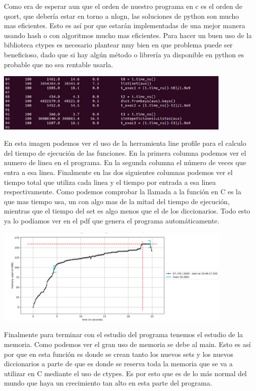 \documentclass{article}
\begin{document}
Como era de esperar aun que el orden de nuestro programa en c es el orden de qsort, que debería estar en torno a nlogn, las soluciones de python son mucho mas eficientes. Esto es así por que estarán implementadas de una mejor manera usando hash o con algoritmos mucho mas eficientes. Para hacer un buen uso de la biblioteca ctypes es necesario plantear muy bien en que problema puede ser beneficioso, dado que si hay algún método o librería ya disponible en python es probable que no sea rentable usarla.

\includegraphics[width=11.5cm]{Line_profile.PNG}

En esta imagen podemos ver el uso de la herramienta line profile para el calculo del tiempo de ejecución de las funciones. En la primera columna podemos ver el numero de linea en el programa. En la segunda columna el número de veces que entra a esa linea. Finalmente en las dos siguientes columnas podemos ver el tiempo total que utiliza cada linea y el tiempo por entrada a esa linea respectivamente. Como podemos comprobar la llamada a la función en C es la que mas tiempo usa, un con algo mas de la mitad del tiempo de ejecución, mientras que el tiempo del set es algo menos que el de los diccionarios. Todo esto ya lo podíamos ver en el pdf que genera el programa automáticamente.

\includegraphics[width=11.5cm]{memory_profile.PNG}

Finalmente para terminar con el estudio del programa tenemos el estudio de la memoria. Como podemos ver el gran uso de memoria se debe al main. Esto es así por que en esta función es donde se crean tanto los nuevos sets y los nuevos diccionarios a parte de que es donde se reserva toda la memoria que se va a utilizar en C mediante el uso de ctypes. Es por esto que es de lo más normal del mundo que haya un crecimiento tan alto en esta parte del programa.


\nocite{*}

\end{document}
